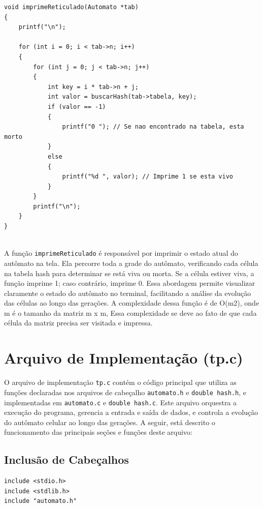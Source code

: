 \documentclass{article}
\begin{document}
\begin{lstlisting}[caption={},label={lst:cod1},language={[x86masm]Assembler}]
void imprimeReticulado(Automato *tab)
{
    printf("\n");

    for (int i = 0; i < tab->n; i++)
    {
        for (int j = 0; j < tab->n; j++)
        {
            int key = i * tab->n + j;
            int valor = buscarHash(tab->tabela, key);
            if (valor == -1)
            {
                printf("0 "); // Se nao encontrado na tabela, esta morto
            }
            else
            {
                printf("%d ", valor); // Imprime 1 se esta vivo
            }
        }
        printf("\n");
    }
}


 \end{lstlisting}

 \par A função \verb|imprimeReticulado| é responsável por imprimir o estado atual do autômato na tela. Ela percorre toda a grade do autômato, verificando cada célula na tabela hash para determinar se está viva ou morta. Se a célula estiver viva, a função imprime 1; caso contrário, imprime 0. Essa abordagem permite visualizar claramente o estado do autômato no terminal, facilitando a análise da evolução das células ao longo das gerações. A complexidade dessa função é de O(m2), onde m é o tamanho da matriz m x m, Essa complexidade se deve ao fato de que cada célula da matriz precisa ser visitada e impressa.


\section{Arquivo de Implementação (tp.c)}

O arquivo de implementação \verb|tp.c| contém o código principal que utiliza as funções declaradas nos arquivos de cabeçalho \verb|automato.h| e \verb|double hash.h|, e implementadas em \verb|automato.c| e \verb|double hash.c|. Este arquivo orquestra a execução do programa, gerencia a entrada e saída de dados, e controla a evolução do autômato celular ao longo das gerações. A seguir, está descrito o funcionamento das principais seções e funções deste arquivo: 


 \subsection{Inclusão de Cabeçalhos}
\begin{lstlisting}[caption={},label={lst:cod1},language={[x86masm]Assembler}]
include <stdio.h>
include <stdlib.h>
include "automato.h"
 \end{lstlisting}
\end{document}
